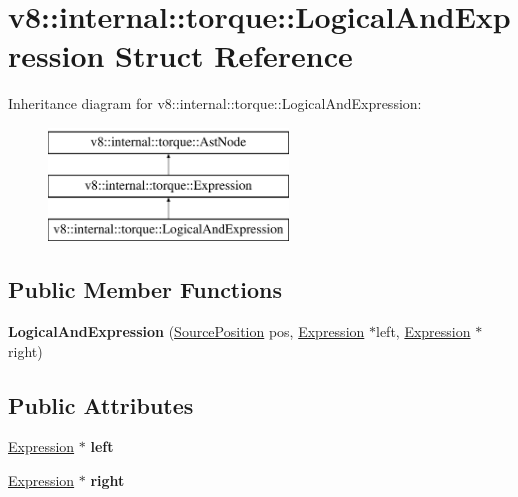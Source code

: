 \hypertarget{structv8_1_1internal_1_1torque_1_1LogicalAndExpression}{}\section{v8\+:\+:internal\+:\+:torque\+:\+:Logical\+And\+Expression Struct Reference}
\label{structv8_1_1internal_1_1torque_1_1LogicalAndExpression}
Inheritance diagram for v8\+:\+:internal\+:\+:torque\+:\+:Logical\+And\+Expression\+:\begin{figure}[H]
\begin{center}
\leavevmode
\includegraphics[height=3.000000cm]{structv8_1_1internal_1_1torque_1_1LogicalAndExpression}
\end{center}
\end{figure}
\subsection*{Public Member Functions}
\begin{DoxyCompactItemize}
\item 
\mbox{\label{structv8_1_1internal_1_1torque_1_1LogicalAndExpression_a53165c6f2b0696bb1ea1751eaac1ad1a}} 
{\bfseries Logical\+And\+Expression} (\mbox{\hyperlink{structv8_1_1internal_1_1torque_1_1SourcePosition}{Source\+Position}} pos, \mbox{\hyperlink{structv8_1_1internal_1_1torque_1_1Expression}{Expression}} $\ast$left, \mbox{\hyperlink{structv8_1_1internal_1_1torque_1_1Expression}{Expression}} $\ast$right)
\end{DoxyCompactItemize}
\subsection*{Public Attributes}
\begin{DoxyCompactItemize}
\item 
\mbox{\label{structv8_1_1internal_1_1torque_1_1LogicalAndExpression_a2748072df770f4d8cdf74e3c3e6baa84}} 
\mbox{\hyperlink{structv8_1_1internal_1_1torque_1_1Expression}{Expression}} $\ast$ {\bfseries left}
\item 
\mbox{\label{structv8_1_1internal_1_1torque_1_1LogicalAndExpression_a123581776a4c9861b19a91731e33a718}} 
\mbox{\hyperlink{structv8_1_1internal_1_1torque_1_1Expression}{Expression}} $\ast$ {\bfseries right}
\end{DoxyCompactItemize}

